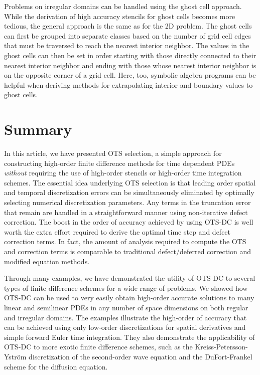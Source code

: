 \documentclass[fleqn,12pt,twoside]{article}
\begin{document}
Problems on irregular domains can be handled using the ghost cell approach. 
While the derivation of high accuracy stencils for ghost cells becomes more
tedious, the general approach is the same as for the 2D problem.  The ghost 
cells can first be grouped into separate classes based on the number of 
grid cell edges that must be traversed to reach the nearest interior neighbor.
The values in the ghost cells can then be set in order starting with those 
directly connected to their nearest interior neighbor and ending with those 
whose nearest interior neighbor is on the opposite corner of a grid cell.
Here, too, symbolic algebra programs can be helpful when deriving methods for 
extrapolating interior and boundary values to ghost cells.


\section{\label{sec:summary} Summary} 
In this article, we have presented OTS selection, a simple approach for
constructing high-order finite difference methods for time dependent PDEs
\emph{without} requiring the use of high-order stencils or high-order time
integration schemes.  The essential idea underlying OTS selection is that 
leading order spatial and temporal discretization errors can be simultaneously
eliminated by optimally selecting numerical discretization parameters.  Any
terms in the truncation error that remain are handled in a straightforward
manner using non-iterative defect correction.  The boost in the order of
accuracy achieved by using OTS-DC is well worth the extra effort required to
derive the optimal time step and defect correction terms.  In fact, the amount
of analysis required to compute the OTS and correction terms is comparable to
traditional defect/deferred correction and modified equation methods.

Through many examples, we have demonstrated the utility of OTS-DC to several
types of finite difference schemes for a wide range of problems.  We showed
how OTS-DC can be used to very easily obtain high-order accurate solutions to
many linear and semilinear PDEs in any number of space dimensions on both
regular and irregular domains.  The examples illustrate the high-order of
accuracy that can be achieved using only low-order discretizations for spatial
derivatives and simple forward Euler time integration.  They also demonstrate
the applicability of OTS-DC to more exotic finite difference schemes, such as
the Kreiss-Petersson-Ystr\"om discretization of the second-order wave equation
and the DuFort-Frankel scheme for the diffusion equation.
\end{document}
